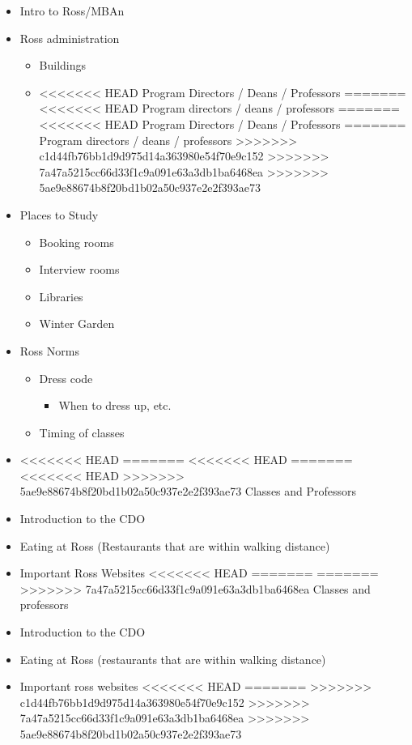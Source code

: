 \documentclass[
]{book}
\providecommand{\tightlist}{%
  \setlength{\itemsep}{0pt}\setlength{\parskip}{0pt}}
\begin{document}
\begin{itemize}
\tightlist
\item
  Intro to Ross/MBAn
\item
  Ross administration

  \begin{itemize}
  \tightlist
  \item
    Buildings
  \item
<<<<<<< HEAD
    Program Directors / Deans / Professors
=======
<<<<<<< HEAD
    Program directors / deans / professors
=======
<<<<<<< HEAD
    Program Directors / Deans / Professors
=======
    Program directors / deans / professors
>>>>>>> c1d44fb76bb1d9d975d14a363980e54f70e9c152
>>>>>>> 7a47a5215cc66d33f1c9a091e63a3db1ba6468ea
>>>>>>> 5ae9e88674b8f20bd1b02a50c937e2e2f393ae73
  \end{itemize}
\item
  Places to Study

  \begin{itemize}
  \tightlist
  \item
    Booking rooms
  \item
    Interview rooms
  \item
    Libraries
  \item
    Winter Garden
  \end{itemize}
\item
  Ross Norms

  \begin{itemize}
  \tightlist
  \item
    Dress code

    \begin{itemize}
    \tightlist
    \item
      When to dress up, etc.
    \end{itemize}
  \item
    Timing of classes
  \end{itemize}
\item
<<<<<<< HEAD
=======
<<<<<<< HEAD
=======
<<<<<<< HEAD
>>>>>>> 5ae9e88674b8f20bd1b02a50c937e2e2f393ae73
  Classes and Professors
\item
  Introduction to the CDO
\item
  Eating at Ross (Restaurants that are within walking distance)
\item
  Important Ross Websites
<<<<<<< HEAD
=======
=======
>>>>>>> 7a47a5215cc66d33f1c9a091e63a3db1ba6468ea
  Classes and professors
\item
  Introduction to the CDO
\item
  Eating at Ross (restaurants that are within walking distance)
\item
  Important ross websites
<<<<<<< HEAD
=======
>>>>>>> c1d44fb76bb1d9d975d14a363980e54f70e9c152
>>>>>>> 7a47a5215cc66d33f1c9a091e63a3db1ba6468ea
>>>>>>> 5ae9e88674b8f20bd1b02a50c937e2e2f393ae73


\end{itemize}
\end{document}
